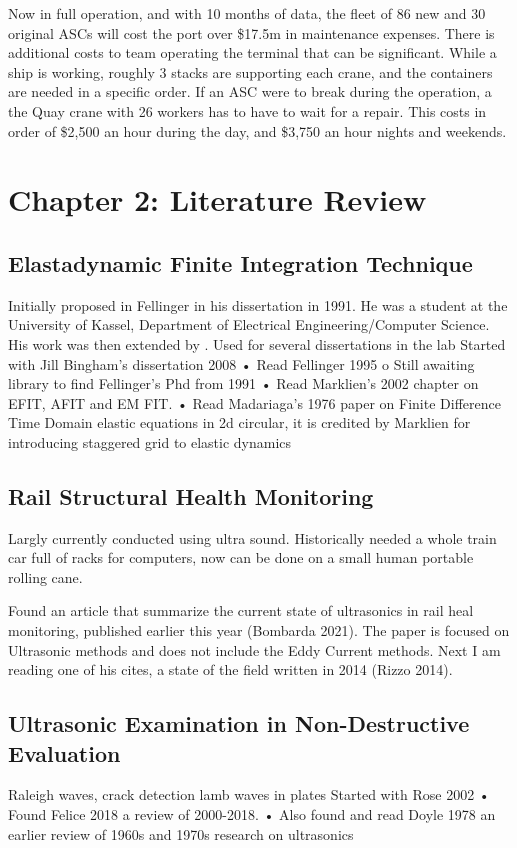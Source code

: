 \documentclass[journal=jacsat,manuscript=article]{achemso}
\begin{document}
Now in full operation, and with 10 months of data, the fleet of 86 new and 30 original ASCs will cost the port over \$17.5m in maintenance expenses. There is additional costs to team operating the terminal that can be significant. While a ship is working, roughly 3 stacks are supporting each crane, and the containers are needed in a specific order. If an ASC were to break during the operation, a the Quay crane with 26 workers has to have to wait for a repair. This costs in order of \$2,500 an hour during the day, and \$3,750 an hour nights and weekends.


\pagebreak
\section{Chapter 2: Literature Review}
\subsection{Elastadynamic Finite Integration Technique}
Initially proposed in Fellinger in his dissertation in 1991.  He was a student at the University of Kassel, Department of Electrical Engineering/Computer Science.  His work was then extended by . Used for several dissertations in the lab 
Started with Jill Bingham’s dissertation 2008
•         Read Fellinger 1995
o   Still awaiting library to find Fellinger’s Phd from 1991
•         Read Marklien’s 2002 chapter on EFIT, AFIT and EM FIT.
•         Read Madariaga’s 1976 paper on Finite Difference Time Domain elastic equations in 2d circular, it is credited by Marklien for introducing staggered grid to elastic dynamics


\subsection{Rail Structural Health Monitoring}
Largly currently conducted using ultra sound. Historically needed a whole train car full of racks for computers, now can be done on a small human portable rolling cane.

Found an article that summarize the current state of ultrasonics in rail heal monitoring, published earlier this year (Bombarda 2021). The paper is focused on Ultrasonic methods and does not include the Eddy Current methods.
Next I am reading one of his cites, a state of the field written in 2014 (Rizzo 2014).  


\subsection{Ultrasonic Examination in Non-Destructive Evaluation}
Raleigh waves, crack detection lamb waves in plates 
Started with Rose 2002
•         Found Felice 2018 a review of 2000-2018.
•         Also found and read Doyle 1978 an earlier review of 1960s and 1970s research on ultrasonics
\end{document}
